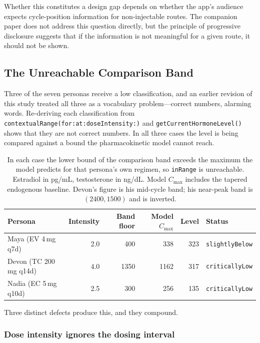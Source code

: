 \documentclass[11pt,a4paper]{article}
\newcommand{\code}[1]{\texttt{\small #1}}
\begin{document}
Whether this constitutes a design gap depends on whether the app's audience
expects cycle-position information for non-injectable routes. The companion
paper does not address this question directly, but the principle of
progressive disclosure suggests that if the information is not meaningful
for a given route, it should not be shown.

\subsection{The Unreachable Comparison Band}
\label{sec:unreachable}

Three of the seven personas receive a low classification, and an earlier
revision of this study treated all three as a vocabulary problem---correct
numbers, alarming words. Re-deriving each classification from
\code{contextualRange(for:at:doseIntensity:)} and
\code{getCurrentHormoneLevel()} shows that they are not correct numbers. In
all three cases the level is being compared against a bound the
pharmacokinetic model cannot reach.

\begin{table}[h]
\centering
\small
\begin{tabular}{@{}lrrrrl@{}}
\toprule
\textbf{Persona} & \textbf{Intensity} & \textbf{Band floor} &
\textbf{Model $C_{\max}$} & \textbf{Level} & \textbf{Status} \\
\midrule
Maya (EV 4\,mg q7d)   & 2.0 & 400 & 338 & 323 & \code{slightlyBelow} \\
Devon (TC 200\,mg q14d) & 4.0 & 1350 & 1162 & 317 & \code{criticallyLow} \\
Nadia (EC 5\,mg q10d) & 2.5 & 300 & 256 & 135 & \code{criticallyLow} \\
\bottomrule
\end{tabular}
\caption{In each case the lower bound of the comparison band exceeds the
maximum the model predicts for that persona's own regimen, so
\code{inRange} is unreachable. Estradiol in pg/mL, testosterone in ng/dL.
Model $C_{\max}$ includes the tapered endogenous baseline. Devon's figure is
his mid-cycle band; his near-peak band is $(2400, 1500)$ and is inverted.}
\label{tab:unreachable}
\end{table}

Three distinct defects produce this, and they compound.

\subsubsection{Dose intensity ignores the dosing interval}
\end{document}
